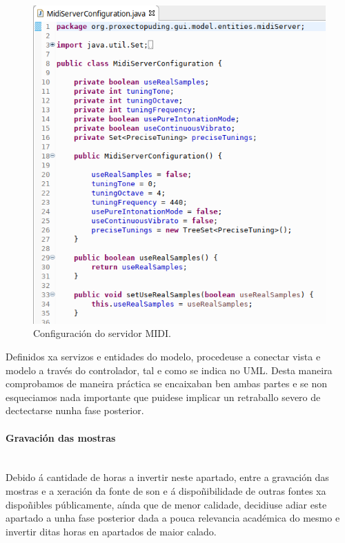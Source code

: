    \begin{figure}[htbp]
    \centering
    \includegraphics[scale=0.6, keepaspectratio=true]{./imagenes/midi-server-configuration.png}
    \caption{Configuración do servidor MIDI.}
    \label{figura:MidiServerConfiguration}
   \end{figure}
   
   Definidos xa servizos e entidades do modelo, procedeuse a conectar vista e
   modelo a través do controlador, tal e como se indica no UML. Desta maneira
   comprobamos de maneira práctica se encaixaban ben ambas partes e se non
   esqueciamos nada importante que puidese implicar un retraballo severo de
   dectectarse nunha fase posterior.

   \paragraph{Gravación das mostras}\mbox{}\\
   
   Debido á cantidade de horas a invertir neste apartado, entre a gravación das
   mostras e a xeración da fonte de son e á dispoñibilidade de outras fontes xa
   dispoñibles públicamente, aínda que de menor calidade, decidiuse adiar este
   apartado a unha fase posterior dada a pouca relevancia académica do mesmo e
   invertir ditas horas en apartados de maior calado.

